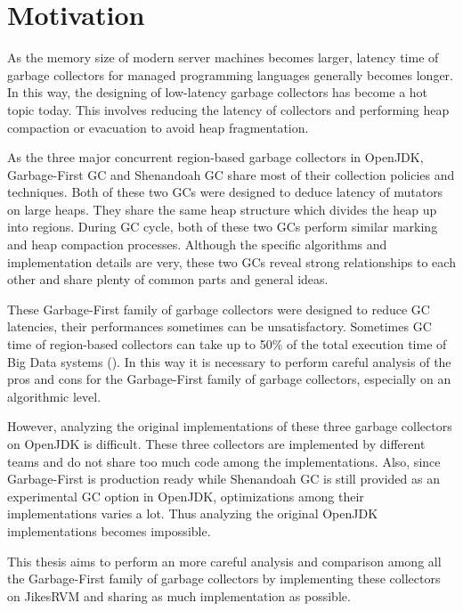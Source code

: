 
\section{Motivation}
As the memory size of modern server machines becomes larger, latency time of
garbage collectors for managed programming languages generally becomes longer.
In this way, the designing of low-latency garbage collectors has become
a hot topic today. This involves reducing the latency of collectors and
performing heap compaction or evacuation to avoid heap fragmentation.

As the three major concurrent region-based garbage collectors in OpenJDK,
Garbage-First GC and Shenandoah GC share most of their collection policies and techniques.
Both of these two GCs were designed to deduce latency of mutators on large heaps.
They share the same heap structure which divides the heap up into regions.
During GC cycle, both of these two GCs perform similar marking and
heap compaction processes.
Although the specific algorithms and implementation details are very, these two
GCs reveal strong relationships to each other and share plenty of common parts and general ideas.

These Garbage-First family of garbage collectors were designed to reduce GC latencies,
their performances sometimes can be unsatisfactory. Sometimes GC time of region-based collectors
can take up to 50\% of the total execution time of Big Data systems (\cite{briandemsky2015speculative}).
In this way it is necessary to perform careful analysis of the pros and cons for the 
Garbage-First family of garbage collectors, especially on an algorithmic level.

However, analyzing the original implementations of these three garbage
collectors on OpenJDK is difficult. These three collectors are implemented by
different teams and do not share too much code among the implementations. Also,
since Garbage-First is production ready while Shenandoah GC is still provided as an
experimental GC option in OpenJDK, optimizations among their implementations varies a lot.
Thus analyzing the original OpenJDK implementations becomes impossible.

This thesis aims to perform an more careful analysis and comparison among all the 
Garbage-First family of garbage collectors by implementing these collectors on JikesRVM
and sharing as much implementation as possible.

